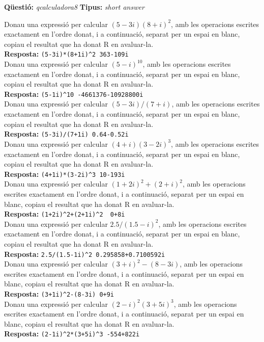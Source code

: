 \documentclass[10pt]{article}
\newcommand{\answer}{\textbf{Resposta: }}
\newcommand{\newquestion}[2]{\noindent\textbf{Qüestió: }\emph{#1} \textbf{Tipus: }\emph{#2}\medskip}
\begin{document}
\newpage

\newquestion{qcalculadora8}{short answer} 
\def\qcalculadora8#1{Donau una expressió per calcular $#1$,  amb les operacions escrites exactament en l'ordre donat,  i a continuació, separat per un espai en blanc, copiau el resultat que ha donat R en avaluar-la.}

\qcalculadora8{(5-3i)(8+i)^2}\\
\answer{\verb?(5-3i)*(8+1i)^2 363-109i?}\\

\qcalculadora8{(5-i)^{10}}\\
\answer{\verb?(5-1i)^10 -4661376-10928800i?}\\

\qcalculadora8{(5-3i)/(7+i)}\\
\answer{\verb?(5-3i)/(7+1i) 0.64-0.52i?}\\

\qcalculadora8{(4+i)(3-2i)^3}\\
\answer{\verb?(4+1i)*(3-2i)^3 10-193i?}\\

\qcalculadora8{(1+2i)^2+(2+i)^2}\\
\answer{\verb?(1+2i)^2+(2+1i)^2  0+8i?}\\

\qcalculadora8{2.5/(1.5-i)^2}\\
\answer{\verb?2.5/(1.5-1i)^2 0.295858+0.7100592i?}\\

\qcalculadora8{(3+i)^2-(8-3i)}\\
\answer{\verb?(3+1i)^2-(8-3i) 0+9i?}\\

\qcalculadora8{(2-i)^2(3+5i)^3}\\
\answer{\verb?(2-1i)^2*(3+5i)^3 -554+822i?}\\
\end{document}
